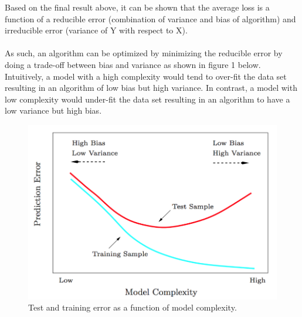 \documentclass[a4paper]{article}
\begin{document}
\noindent Based on the final result above, it can be shown that the average loss is a function of a reducible error (combination of variance and bias of algorithm) and irreducible error (variance of Y with respect to X). \\
\\
As such, an algorithm can be optimized by minimizing the reducible error by doing a trade-off between bias and variance as shown in figure 1 below. Intuitively, a model with a high complexity would tend to over-fit the data set resulting in an algorithm of low bias but high variance. In contrast, a model with low complexity would under-fit the data set resulting in an algorithm to have a low variance but high bias. 
\begin{figure}[H]
\centering
\captionsetup{justification=centering}
\includegraphics[width=1\textwidth]{Figure_1.PNG}
\caption{\label{fig:1}Test and training error as a function of model complexity.}
\end{figure}

\label{sec:tradeoff}
\end{document}

